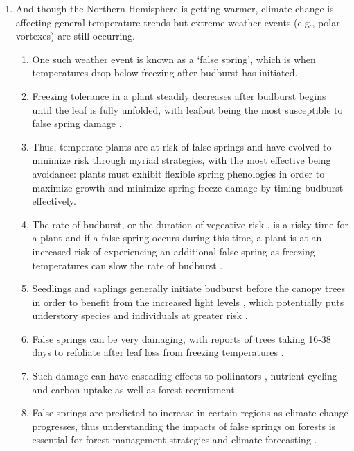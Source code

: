 \documentclass{article}\usepackage[]{graphicx}\usepackage[]{color}
\begin{document}
\begin{enumerate}
\item And though the Northern Hemisphere is getting warmer, climate change is affecting general temperature trends but extreme weather events (e.g., polar vortexes) are still occurring. 
  \begin{enumerate}
  \item One such weather event is known as a `false spring', which is when temperatures drop below freezing \citep[][i.e., below -2.2$^{\circ}$C]{Schwartz2002} after budburst has initiated.
  \item Freezing tolerance in a plant steadily decreases after budburst begins until the leaf is fully unfolded, with leafout being the most susceptible to false spring damage \citep {Lenz2016}.
  \item Thus, temperate plants are at risk of false springs and have evolved to minimize risk through myriad strategies, with the most effective being avoidance: plants must exhibit flexible spring phenologies in order to maximize growth and minimize spring freeze damage by timing budburst effectively.
  \item The rate of budburst, or the duration of vegeative risk \citep{Chamberlain2019}, is a risky time for a plant and if a false spring occurs during this time, a plant is at an increased risk of experiencing an additional false spring as freezing temperatures can slow the rate of budburst \citep{Augspurger2009}.
  \item Seedlings and saplings generally initiate budburst before the canopy trees in order to benefit from the increased light levels \citep {Augspurger2008, Vitasse2013}, which potentially puts understory species and individuals at greater risk \citep{Vitasse2014}.
  \item False springs can be very damaging, with reports of trees taking 16-38 days to refoliate after leaf loss from freezing temperatures \citep{Augspurger2009, Augspurger2013, Gu2008, Menzel2015}. 
  \item Such damage can have cascading effects to pollinators \citep{Boggs2012, Pardee2017}, nutrient cycling and carbon uptake as well as forest recruitment \citep{Hufkens2012, Klosterman2018, Richardson2013}
  \item False springs are predicted to increase in certain regions as climate change progresses, thus understanding the impacts of false springs on forests is essential for forest management strategies and climate forecasting \citep{OBrien2019}.
  \end{enumerate}
  

\end{enumerate}
\end{document}
